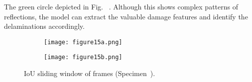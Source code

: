 The green circle depicted in Fig.~\DIFdelbegin {}\DIFdelend \DIFaddbegin {}\DIFaddend {} \DIFaddbegin {}\DIFaddend .
Although this \DIFdelbegin {}\DIFdelend \DIFaddbegin {}\DIFaddend shows complex patterns of \DIFdelbegin {}\DIFdelend \DIFaddbegin {}\DIFaddend reflections, the model can extract the valuable damage features and identify the delaminations accordingly.
\begin{figure} [!h]
	\centering
	\begin{subfigure}[b]{1\textwidth}
		\centering
		\DIFdelbeginFL %
\DIFdelendFL \DIFaddbeginFL \texttt{[image: figure15a.png]}
		\DIFaddendFL \caption{\DIFaddbeginFL {}\DIFaddendFL }
		\label{fig:L3_S4_B_333x333p_50kHz_5HC_IoU}
	\end{subfigure}
	\par\medskip
	\begin{subfigure}[b]{1\textwidth}
		\centering
		\DIFdelbeginFL %
\DIFdelendFL \DIFaddbeginFL \texttt{[image: figure15b.png]}
		\DIFaddendFL \caption{\DIFaddbeginFL {}\DIFaddendFL } 
		\label{fig:L3_S4_B_333x333p_50kHz_5HC_shapes_}
	\end{subfigure}
	\caption{IoU \DIFdelbeginFL {}\DIFdelendFL \DIFaddbeginFL {}\DIFaddendFL sliding window of frames (Specimen~).}
	\label{fig:L3_S4_B_333x333p_50kHz_5HC_IoU_centre_window}
\end{figure} 

